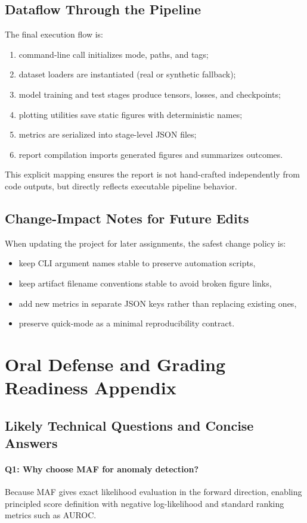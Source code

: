 \documentclass[conference]{IEEEtran}
\begin{document}
\subsection{Dataflow Through the Pipeline}
The final execution flow is:
\begin{enumerate}
\item command-line call initializes mode, paths, and tags;
\item dataset loaders are instantiated (real or synthetic fallback);
\item model training and test stages produce tensors, losses, and checkpoints;
\item plotting utilities save static figures with deterministic names;
\item metrics are serialized into stage-level JSON files;
\item report compilation imports generated figures and summarizes outcomes.
\end{enumerate}
This explicit mapping ensures the report is not hand-crafted independently from code outputs, but directly reflects executable pipeline behavior.

\subsection{Change-Impact Notes for Future Edits}
When updating the project for later assignments, the safest change policy is:
\begin{itemize}
\item keep CLI argument names stable to preserve automation scripts,
\item keep artifact filename conventions stable to avoid broken figure links,
\item add new metrics in separate JSON keys rather than replacing existing ones,
\item preserve quick-mode as a minimal reproducibility contract.
\end{itemize}

\section{Oral Defense and Grading Readiness Appendix}
\subsection{Likely Technical Questions and Concise Answers}
\paragraph{Q1: Why choose MAF for anomaly detection?}
Because MAF gives exact likelihood evaluation in the forward direction, enabling principled score definition with negative log-likelihood and standard ranking metrics such as AUROC.
\end{document}
